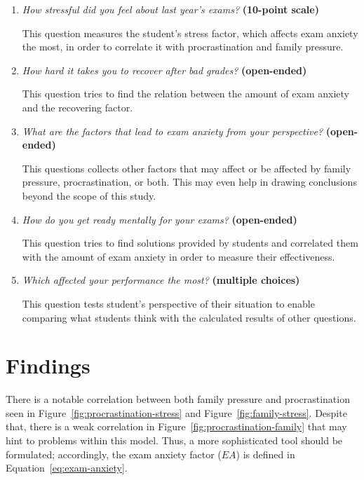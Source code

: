 \documentclass[12pt]{report}
\begin{document}
\begin{multicols}{2}
\begin{enumerate}[wide, labelwidth=!, labelindent=0pt]
\item \textit{How stressful did you feel about last year's exams?}
\textbf{(10-point scale)}

This question measures the student's stress factor, which affects exam anxiety
the most, in order to correlate it with procrastination and family pressure.

\item \textit{How hard it takes you to recover after bad grades?}
\textbf{(open-ended)}

This question tries to find the relation between the amount of exam anxiety
and the recovering factor.

\item \textit{What are the factors that lead to exam anxiety from your
perspective?}
\textbf{(open-ended)}

This questions collects other factors that may affect or be affected by family
pressure, procrastination, or both. This may even help in drawing conclusions
beyond the scope of this study.

\item \textit{How do you get ready mentally for your exams?}
\textbf{(open-ended)}

This question tries to find solutions provided by students and correlated them
with the amount of exam anxiety in order to measure their effectiveness.

\item \textit{Which affected your performance the most?}
\textbf{(multiple choices)}

This question tests student's perspective of their situation to enable comparing
what students think with the calculated results of other questions.

\end{enumerate}

\section{Findings}

There is a notable correlation between both family pressure and procrastination
seen in Figure~\ref{fig:procrastination-stress} and
Figure~\ref{fig:family-stress}. Despite that, there is a weak correlation in
Figure~\ref{fig:procrastination-family} that may hint to problems within this
model. Thus, a more sophisticated tool should be formulated; accordingly, the
exam anxiety factor ($EA$) is defined in Equation~\ref{eq:exam-anxiety}.


\end{multicols}
\end{document}
